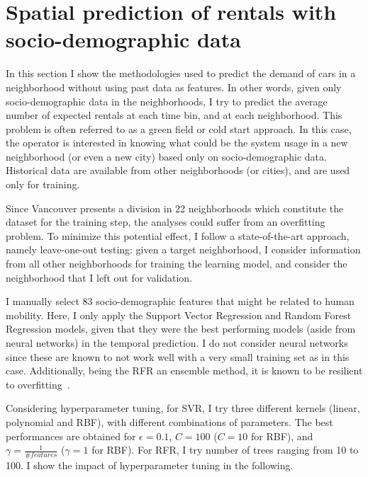 \section{Spatial prediction of rentals with socio-demographic data}
\label{sec:8_5_spatial analyses}

In this section I show the methodologies used to predict the demand of cars in a neighborhood without using past data as features. In other words, given only socio-demographic data in the neighborhoods, I try to predict the average number of expected rentals at each time bin, and at each neighborhood.
This problem is often referred to as a green field or cold start approach. In this case, the operator is interested in knowing what could be the system usage in a new neighborhood (or even a new city) based only on socio-demographic data. Historical data are available from other neighborhoods (or cities), and are used only for training.

Since Vancouver presents a division in 22 neighborhoods which constitute the dataset for the training step, the analyses could suffer from an overfitting problem. To minimize this potential effect, I follow a state-of-the-art approach, namely leave-one-out testing: given a target neighborhood, I consider information from all other neighborhoods for training the learning model, and consider the neighborhood that I left out for validation.

I manually select 83 socio-demographic features that might be related to human mobility.  Here, I only apply the Support Vector Regression and Random Forest Regression models, given that they were the best performing models (aside from neural networks) in the temporal prediction.
I do not consider neural networks since these are known to not work well with a very small training set as in this case.
Additionally, being the RFR an ensemble method, it is known to be resilient to overfitting~\citep{Bishop:2006}.

Considering hyperparameter tuning, for SVR, I try three different kernels (linear, polynomial and RBF), with different combinations of parameters. The best performances are obtained for $\epsilon=0.1$, $C=100$ ($C=10$ for RBF), and $\gamma=\frac{1}{\# features}$ ($\gamma=1$ for RBF). For RFR, I try number of trees ranging from 10 to 100. I show the impact of hyperparameter tuning in the following.
  
